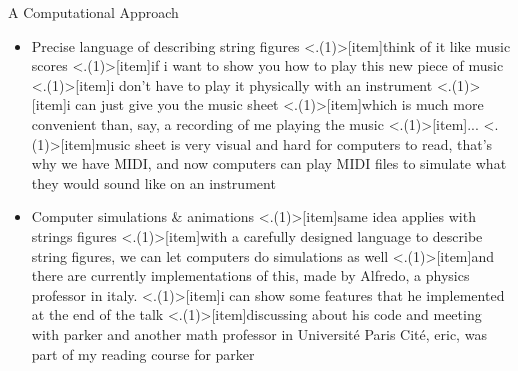 \begin{frame}{A Computational Approach}
\begin{itemize}
    \item Precise language of describing string figures
    \note<.(1)>[item]{think of it like music scores}
    \note<.(1)>[item]{if i want to show you how to play this new piece of music}
    \note<.(1)>[item]{i don't have to play it physically with an instrument}
    \note<.(1)>[item]{i can just give you the music sheet}
    \note<.(1)>[item]{which is much more convenient than, say, a recording of me playing the music}
    \note<.(1)>[item]{...}
    \note<.(1)>[item]{music sheet is very visual and hard for computers to read, that's why we have MIDI, and now computers can play MIDI files to simulate what they would sound like on an instrument}
    \item Computer simulations \& animations
    \note<.(1)>[item]{same idea applies with strings figures}
    \note<.(1)>[item]{with a carefully designed language to describe string figures, we can let computers do simulations as well}
    \note<.(1)>[item]{and there are currently implementations of this, made by Alfredo, a physics professor in italy.}
    \note<.(1)>[item]{i can show some features that he implemented at the end of the talk}
    \note<.(1)>[item]{discussing about his code and meeting with parker and another math professor in Université Paris Cité, eric, was part of my reading course for parker}
\end{itemize}

\end{frame}
